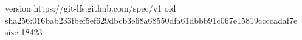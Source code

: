 version https://git-lfs.github.com/spec/v1
oid sha256:016bab233fbef5ef629dbcb3e68a68550dfa61dbbb91c067e15819ccccadaf7e
size 18423
